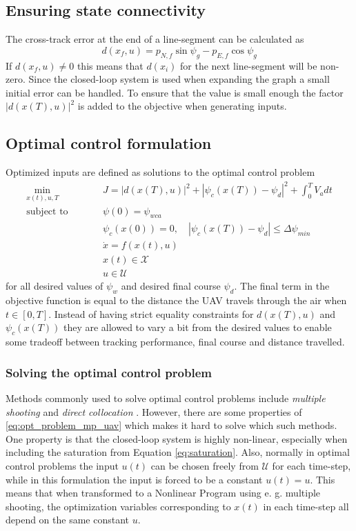 \subsection{Ensuring state connectivity}
The cross-track error at the end of a line-segment can be calculated as 
\begin{equation}
    d(x_f, u) = p_{N,f}\sin\psi_g-p_{E,f}\cos\psi_g
\end{equation}
If $d(x_f, u)\neq0$ this means that $d(x_i)$ for the next line-segment will be non-zero. 
Since the closed-loop system is used when expanding the graph a small initial error can be handled.
To ensure that the value is small enough the factor $|d(x(T), u)|^2$ is added to the objective when generating inputs.
\subsection{Optimal control formulation}
Optimized inputs are defined as solutions to the optimal control problem
\begin{subequations}
    \label{eq:opt_problem_mp_uav}
    \begin{alignat}{3}
    &\min_{x(t),u,T}        &\qquad& J=|d(x(T), u)|^2 + |\psi_c(x(T))-\psi_d|^2 + \int_{0}^{T}V_a dt & \\
    &\text{subject to} & & \psi(0)=\psi_{wca} &\\
    & & & \psi_c(x(0))=0, \quad |\psi_c(x(T))-\psi_d| \leq \Delta\psi_{min} &\\
    & & & \dot{x}=f(x(t), u) &\\
    & & & x(t)\in\mathcal{X}& \\
    & & & u\in\mathcal{U} &
    \end{alignat}
\end{subequations}
for all desired values of $\psi_w$ and desired final course $\psi_d$. The final term in the objective function is equal to the distance the UAV 
travels through the air when $t\in[0, T]$. Instead of having strict equality constraints for $d(x(T), u)$ and $\psi_c(x(T))$ they 
are allowed to vary a bit from the desired values to enable some tradeoff between tracking performance, final course and distance travelled.

\subsubsection{Solving the optimal control problem}
Methods commonly used to solve optimal control problems include \textit{multiple shooting} and \textit{direct collocation} \cite{Bergman_lic}. 
However, there are some properties of \eqref{eq:opt_problem_mp_uav} which makes it hard to solve which such methods. 
One property is that the closed-loop system is highly non-linear, especially when including the saturation from Equation \eqref{eq:saturation}. 
Also, normally in optimal control problems the input $u(t)$ can be chosen freely from $\mathcal{U}$ for each time-step, while 
in this formulation the input is forced to be a constant $u(t)=u$. This means that when transformed to a Nonlinear Program using e. g. multiple shooting,
the optimization variables corresponding to $x(t)$ in each time-step all depend on the same constant $u$. 

